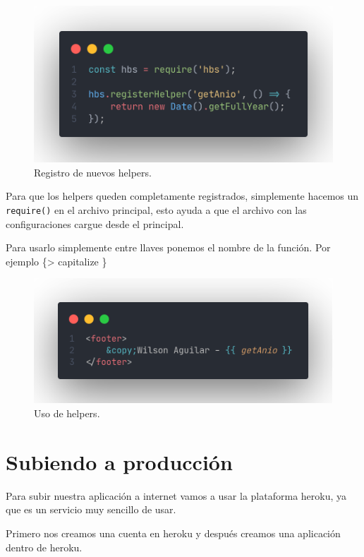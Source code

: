 \documentclass[12pt]{article}
\begin{document}
\begin{figure}[H]
  \centering
  \includegraphics[scale=.4]{assets/images/helpers.png}
  \caption{Registro de nuevos helpers.}
\end{figure}

Para que los helpers queden completamente registrados, simplemente hacemos un \lstinline{require()} en el archivo principal, esto ayuda a que el archivo con las configuraciones cargue desde el principal.

Para usarlo simplemente entre llaves ponemos el nombre de la función. Por ejemplo \{> capitalize \}

\begin{figure}[H]
  \centering
  \includegraphics[scale=.4]{assets/images/helper-use.png}
  \caption{Uso de helpers.}
\end{figure}

\section{Subiendo a producción}

Para subir nuestra aplicación a internet vamos a usar la plataforma heroku, ya que es un servicio muy sencillo de usar.

Primero nos creamos una cuenta en heroku y después creamos una aplicación dentro de heroku.
\end{document}
